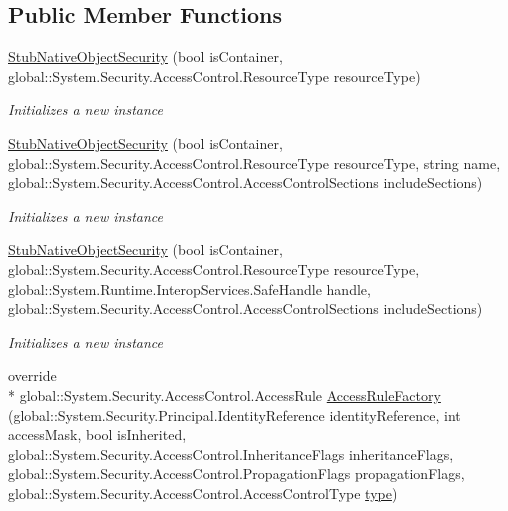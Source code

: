 \subsection*{Public Member Functions}
\begin{DoxyCompactItemize}
\item 
\hyperlink{class_system_1_1_security_1_1_access_control_1_1_fakes_1_1_stub_native_object_security_aac58e70f707a865d36e871305f1c7e8d}{Stub\-Native\-Object\-Security} (bool is\-Container, global\-::\-System.\-Security.\-Access\-Control.\-Resource\-Type resource\-Type)
\begin{DoxyCompactList}\small\item\em Initializes a new instance\end{DoxyCompactList}\item 
\hyperlink{class_system_1_1_security_1_1_access_control_1_1_fakes_1_1_stub_native_object_security_ac379310f949374eb997a43cc600678ea}{Stub\-Native\-Object\-Security} (bool is\-Container, global\-::\-System.\-Security.\-Access\-Control.\-Resource\-Type resource\-Type, string name, global\-::\-System.\-Security.\-Access\-Control.\-Access\-Control\-Sections include\-Sections)
\begin{DoxyCompactList}\small\item\em Initializes a new instance\end{DoxyCompactList}\item 
\hyperlink{class_system_1_1_security_1_1_access_control_1_1_fakes_1_1_stub_native_object_security_a185b85b43d156ac4d0d2de1565785c1a}{Stub\-Native\-Object\-Security} (bool is\-Container, global\-::\-System.\-Security.\-Access\-Control.\-Resource\-Type resource\-Type, global\-::\-System.\-Runtime.\-Interop\-Services.\-Safe\-Handle handle, global\-::\-System.\-Security.\-Access\-Control.\-Access\-Control\-Sections include\-Sections)
\begin{DoxyCompactList}\small\item\em Initializes a new instance\end{DoxyCompactList}\item 
override \\*
global\-::\-System.\-Security.\-Access\-Control.\-Access\-Rule \hyperlink{class_system_1_1_security_1_1_access_control_1_1_fakes_1_1_stub_native_object_security_a8f71d1baaef6859bf2c27e75c55ae4ce}{Access\-Rule\-Factory} (global\-::\-System.\-Security.\-Principal.\-Identity\-Reference identity\-Reference, int access\-Mask, bool is\-Inherited, global\-::\-System.\-Security.\-Access\-Control.\-Inheritance\-Flags inheritance\-Flags, global\-::\-System.\-Security.\-Access\-Control.\-Propagation\-Flags propagation\-Flags, global\-::\-System.\-Security.\-Access\-Control.\-Access\-Control\-Type \hyperlink{jquery-1_810_82-vsdoc_8js_a3940565e83a9bfd10d95ffd27536da91}{type})

\end{DoxyCompactItemize}

